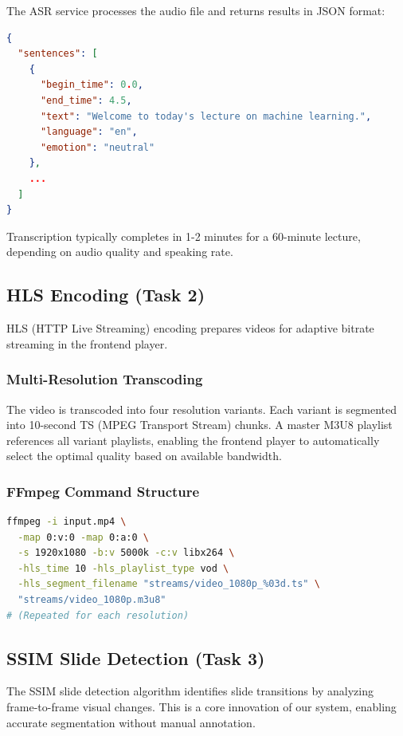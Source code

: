 The ASR service processes the audio file and returns results in JSON format:

\begin{lstlisting}[language=json, caption={ASR Response Format}]
{
  "sentences": [
    {
      "begin_time": 0.0,
      "end_time": 4.5,
      "text": "Welcome to today's lecture on machine learning.",
      "language": "en",
      "emotion": "neutral"
    },
    ...
  ]
}
\end{lstlisting}

Transcription typically completes in 1-2 minutes for a 60-minute lecture, depending on audio quality and speaking rate.

\subsection{HLS Encoding (Task 2)}

HLS (HTTP Live Streaming) encoding prepares videos for adaptive bitrate streaming in the frontend player.

\subsubsection{Multi-Resolution Transcoding}

The video is transcoded into four resolution variants. Each variant is segmented into 10-second TS (MPEG Transport Stream) chunks. A master M3U8 playlist references all variant playlists, enabling the frontend player to automatically select the optimal quality based on available bandwidth.

\subsubsection{FFmpeg Command Structure}

\begin{lstlisting}[language=bash, caption={HLS Encoding FFmpeg Command}]
ffmpeg -i input.mp4 \
  -map 0:v:0 -map 0:a:0 \
  -s 1920x1080 -b:v 5000k -c:v libx264 \
  -hls_time 10 -hls_playlist_type vod \
  -hls_segment_filename "streams/video_1080p_%03d.ts" \
  "streams/video_1080p.m3u8"
# (Repeated for each resolution)
\end{lstlisting}

\subsection{SSIM Slide Detection (Task 3)}

The SSIM slide detection algorithm identifies slide transitions by analyzing frame-to-frame visual changes. This is a core innovation of our system, enabling accurate segmentation without manual annotation.

